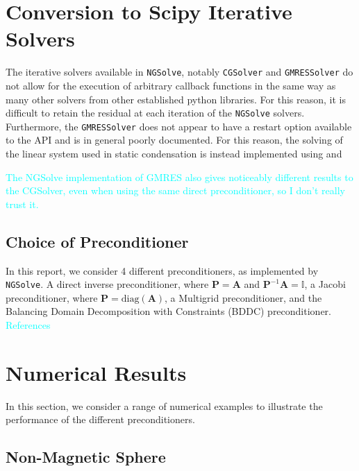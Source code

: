 \documentclass[a4paper,12]{elsarticle}
\theoremstyle{definition}
\begin{document}
\section{Conversion to Scipy Iterative Solvers} \label{sect:scipy}
The iterative solvers available in \texttt{NGSolve}, notably \texttt{CGSolver} and \texttt{GMRESSolver} do not allow for the execution of arbitrary callback functions in the same way as many other solvers from other established python libraries. For this reason, it is difficult to retain the residual at each iteration of the \texttt{NGSolve} solvers. Furthermore, the \texttt{GMRESSolver} does not appear to have a restart option available to the API and is in general poorly documented. For this reason, the solving of the linear system used in static condensation is instead implemented using and 

\textcolor{cyan}{The NGSolve implementation of GMRES also gives noticeably different results to the CGSolver, even when using the same direct preconditioner, so I don't really trust it.}


%

%
\subsection{Choice of Preconditioner}
In this report, we consider 4 different preconditioners, as implemented by \texttt{NGSolve}. A direct inverse preconditioner, where $\mathbf{P} = \mathbf{A}$ and $\mathbf{P}^{-1}\mathbf{A} = \mathbb{I}$, a Jacobi preconditioner, where $\mathbf{P} = \mathrm{diag}(\mathbf{A})$, a Multigrid preconditioner, and the Balancing Domain Decomposition with Constraints (BDDC) preconditioner. \textcolor{cyan}{References}


\section{Numerical Results}
In this section, we consider a range of numerical examples to illustrate the performance of the different preconditioners.

\subsection{Non-Magnetic Sphere}
\end{document}

